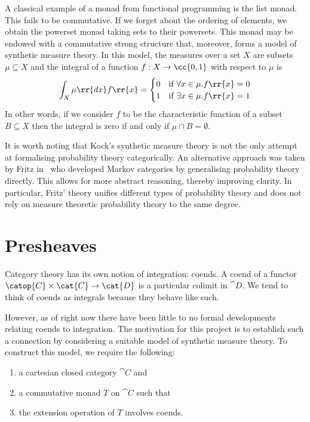 A classical example of a monad from functional programming is the list monad.
This fails to be commutative. If we forget about the ordering of elements, we
obtain the powerset monad taking sets to their powersets. This monad may be
endowed with a commutative strong structure that, moreover, forms a model of synthetic
measure theory. In this model, the measures over a set $X$ are subsets
$\mu\subseteq X$ and the integral of a function $f:X\to\cc{0,1}$ with respect
to $\mu$ is
\begin{align*}
  \int_X \mu\rr{dx}f\rr{x} = \begin{cases}
    0 & \text{if }\forall  x\in \mu. f\rr{x}=0 \\
    1 & \text{if }\exists  x\in \mu. f\rr{x}=1
  \end{cases}
\end{align*}
In other words, if we consider $f$ to be the characteristic function of a subset $B\subseteq X$
then the integral is zero if and only if $\mu\cap B=\emptyset$.

It is worth noting that Kock's synthetic measure theory is not the only attempt at
formalising probability theory categorically. An alternative approach was taken by
Fritz in~\cite{fritz2020} who developed Markov categories by generalising probability
theory directly. This allows for more abstract reasoning,
thereby improving clarity. In particular, Fritz' theory unifies different types of probability
theory and does not rely on measure theoretic probability theory to the same degree.

\section{Presheaves}

Category theory has its own notion of integration: coends. A coend of a
functor $\catop{C}\times\cat{C}\to\cat{D}$ is a particular colimit in
$\cat{D}$. We tend to think of coends as integrals because they behave
like such.

However, as of right now there have been little to no formal developments
relating coends to integration. The motivation for this project is to
establish such a connection by considering a suitable model of synthetic
measure theory. To construct this model, we require the following:

\begin{enumerate}
  \item a cartesian closed category $\cat{C}$ and
  \item a commutative monad $T$ on $\cat{C}$ such that
  \item the extension operation of $T$ involves coends.
\end{enumerate}

